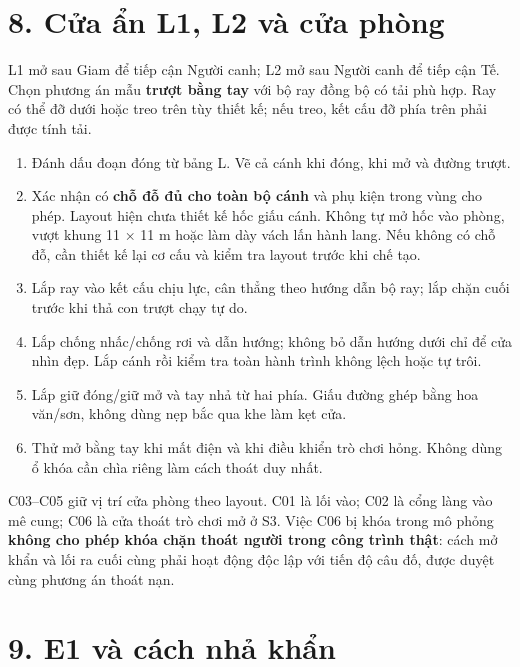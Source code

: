 \documentclass[
  11pt,
  a4paper,
]{article}
\providecommand{\tightlist}{%
  \setlength{\itemsep}{0pt}\setlength{\parskip}{0pt}}
\begin{document}
\section{8. Cửa ẩn L1, L2 và cửa
phòng}\label{cux1eeda-ux1ea9n-l1-l2-vuxe0-cux1eeda-phuxf2ng}

L1 mở sau Giam để tiếp cận Người canh; L2 mở sau Người canh để tiếp cận
Tế. Chọn phương án mẫu \textbf{trượt bằng tay} với bộ ray đồng bộ có tải
phù hợp. Ray có thể đỡ dưới hoặc treo trên tùy thiết kế; nếu treo, kết
cấu đỡ phía trên phải được tính tải.

\begin{enumerate}
\def\labelenumi{\arabic{enumi}.}
\tightlist
\item
  Đánh dấu đoạn đóng từ bảng L. Vẽ cả cánh khi đóng, khi mở và đường
  trượt.
\item
  Xác nhận có \textbf{chỗ đỗ đủ cho toàn bộ cánh} và phụ kiện trong vùng
  cho phép. Layout hiện chưa thiết kế hốc giấu cánh. Không tự mở hốc vào
  phòng, vượt khung 11 × 11 m hoặc làm dày vách lấn hành lang. Nếu không
  có chỗ đỗ, cần thiết kế lại cơ cấu và kiểm tra layout trước khi chế
  tạo.
\item
  Lắp ray vào kết cấu chịu lực, cân thẳng theo hướng dẫn bộ ray; lắp
  chặn cuối trước khi thả con trượt chạy tự do.
\item
  Lắp chống nhấc/chống rơi và dẫn hướng; không bỏ dẫn hướng dưới chỉ để
  cửa nhìn đẹp. Lắp cánh rồi kiểm tra toàn hành trình không lệch hoặc tự
  trôi.
\item
  Lắp giữ đóng/giữ mở và tay nhả từ hai phía. Giấu đường ghép bằng hoa
  văn/sơn, không dùng nẹp bắc qua khe làm kẹt cửa.
\item
  Thử mở bằng tay khi mất điện và khi điều khiển trò chơi hỏng. Không
  dùng ổ khóa cần chìa riêng làm cách thoát duy nhất.
\end{enumerate}

C03--C05 giữ vị trí cửa phòng theo layout. C01 là lối vào; C02 là cổng
làng vào mê cung; C06 là cửa thoát trò chơi mở ở S3. Việc C06 bị khóa
trong mô phỏng \textbf{không cho phép khóa chặn thoát người trong công
trình thật}: cách mở khẩn và lối ra cuối cùng phải hoạt động độc lập với
tiến độ câu đố, được duyệt cùng phương án thoát nạn.

\section{9. E1 và cách nhả
khẩn}\label{e1-vuxe0-cuxe1ch-nhux1ea3-khux1ea9n}
\end{document}
